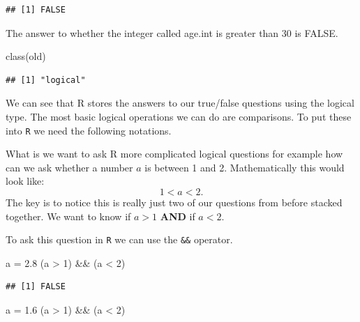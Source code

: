 \documentclass[
]{book}
\newenvironment{Shaded}{\begin{snugshade}}{\end{snugshade}}
\newcommand{\DecValTok}[1]{\textcolor[rgb]{0.00,0.00,0.81}{#1}}
\newcommand{\FloatTok}[1]{\textcolor[rgb]{0.00,0.00,0.81}{#1}}
\newcommand{\FunctionTok}[1]{\textcolor[rgb]{0.00,0.00,0.00}{#1}}
\newcommand{\NormalTok}[1]{#1}
\newcommand{\OtherTok}[1]{\textcolor[rgb]{0.56,0.35,0.01}{#1}}
\newcommand{\SpecialCharTok}[1]{\textcolor[rgb]{0.00,0.00,0.00}{#1}}
\theoremstyle{definition}
\theoremstyle{definition}
\theoremstyle{definition}
\theoremstyle{definition}
\theoremstyle{remark}
\begin{document}
\begin{verbatim}
## [1] FALSE
\end{verbatim}

The answer to whether the integer called age.int is greater than 30 is FALSE.

\begin{Shaded}
\begin{Highlighting}[]
\FunctionTok{class}\NormalTok{(old)}
\end{Highlighting}
\end{Shaded}

\begin{verbatim}
## [1] "logical"
\end{verbatim}

We can see that R stores the answers to our true/false questions using the logical type. The most basic logical operations we can do are comparisons. To put these into \texttt{R} we need the following notations.

What is we want to ask R more complicated logical questions for example how can we ask whether a number \(a\) is between 1 and 2. Mathematically this would look like: \[ 1 < a < 2.\] The key is to notice this is really just two of our questions from before stacked together. We want to know if \(a>1\) \textbf{AND} if \(a<2\).

To ask this question in \texttt{R} we can use the \texttt{\&\&} operator.

\begin{Shaded}
\begin{Highlighting}[]
\NormalTok{a }\OtherTok{=} \FloatTok{2.8}
\NormalTok{(a }\SpecialCharTok{\textgreater{}} \DecValTok{1}\NormalTok{) }\SpecialCharTok{\&\&}\NormalTok{ (a }\SpecialCharTok{\textless{}} \DecValTok{2}\NormalTok{)}
\end{Highlighting}
\end{Shaded}

\begin{verbatim}
## [1] FALSE
\end{verbatim}

\begin{Shaded}
\begin{Highlighting}[]
\NormalTok{a }\OtherTok{=} \FloatTok{1.6}
\NormalTok{(a }\SpecialCharTok{\textgreater{}} \DecValTok{1}\NormalTok{) }\SpecialCharTok{\&\&}\NormalTok{ (a }\SpecialCharTok{\textless{}} \DecValTok{2}\NormalTok{)}
\end{Highlighting}
\end{Shaded}
\end{document}
